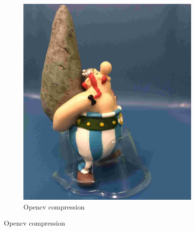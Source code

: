\documentclass{article}
\begin{document}
\begin{figure}[H]
\begin{subfigure}{.5\textwidth}
\includegraphics[scale=0.1]{obe_CV2_10.jpg}
  \caption{Opencv compression}
  \label{fig:sfig2}
\end{subfigure}


\end{figure}
\end{document}
